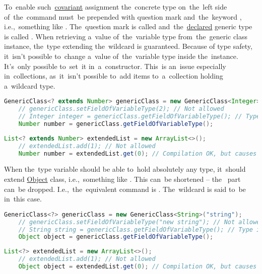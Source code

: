 To~enable such~\hyperref[covariance]{covariant} assignment the~concrete type on~the~left side of~the~command must~be prepended with question mark and~the~keyword , i.e.,~something like .
The~question mark is called  and~the~\hyperref[declarationdefinition]{declared} generic type is called .
When retrieving a~value of~the~variable type from~the~generic class instance, the~type extending the~wildcard is guaranteed.
Because of type safety, it~isn't possible to~change a~value of~the~variable type inside the~instance.
It's~only possible to~set~it in~a~constructor.
This~is an~issue especially in~collections, as~it~isn't possible to~add items to~a~collection holding a~wildcard type.

\begin{lstlisting}[language=Java, title={With the example class}]
    GenericClass<? extends Number> genericClass = new GenericClass<Integer>(1);
    // genericClass.setFieldOfVariableType(2); // Not allowed
    // Integer integer = genericClass.getFieldOfVariableType(); // Type is Number
    Number number = genericClass.getFieldOfVariableType();
\end{lstlisting}
\newpage

\begin{lstlisting}[language=Java, title={With a list}]
    List<? extends Number> extendedList = new ArrayList<>();
    // extendedList.add(1); // Not allowed
    Number number = extendedList.get(0); // Compilation OK, but causes NullPointerException in runtime
\end{lstlisting}

\noindent When the~type variable should be able to~hold absolutely any type, it~should extend \hyperref[javaobject]{Object} class, i.e.,~something like .
This can~be shortened -- the~ part can~be dropped.
I.e.,~the~equivalent command is .
The~wildcard is said to~be  in~this case.

\begin{lstlisting}[language=Java, title={With the example class}]
    GenericClass<?> genericClass = new GenericClass<String>("string");
    // genericClass.setFieldOfVariableType("new string"); // Not allowed
    // String string = genericClass.getFieldOfVariableType(); // Type is Object
    Object object = genericClass.getFieldOfVariableType();
\end{lstlisting}
\begin{lstlisting}[language=Java, title={With a list}]
    List<?> extendedList = new ArrayList<>();
    // extendedList.add(1); // Not allowed
    Object object = extendedList.get(0); // Compilation OK, but causes NullPointerException in runtime
\end{lstlisting}
\newline

